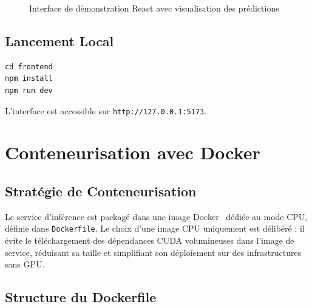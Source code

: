 \documentclass{rapportENSIAS}
\newcommand{\projectpath}[1]{\texttt{#1}}
\begin{document}
\begin{figure}[H]
\centering
{}
\caption{Interface de démonstration React avec visualisation des prédictions}
\label{fig:frontend_demo}
\end{figure}

\subsection{Lancement Local}

\begin{verbatim}
cd frontend
npm install
npm run dev
\end{verbatim}

L'interface est accessible sur \texttt{http://127.0.0.1:5173}.

\section{Conteneurisation avec Docker}

\subsection{Stratégie de Conteneurisation}

Le service d'inférence est packagé dans une image Docker~\cite{docker2014}
dédiée au mode CPU, définie dans \projectpath{Dockerfile}. Le choix d'une
image CPU uniquement est délibéré : il évite le téléchargement des dépendances
CUDA volumineuses dans l'image de service, réduisant sa taille et simplifiant
son déploiement sur des infrastructures sans GPU.

\subsection{Structure du Dockerfile}
\end{document}
